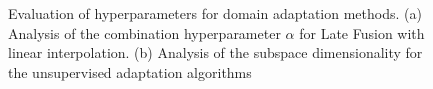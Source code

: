 \begin{figure}
\centering
{}
\caption{Evaluation of hyperparameters for domain adaptation methods. (a) Analysis of the combination hyperparameter $\alpha$ for Late Fusion with linear interpolation. (b) Analysis of the subspace dimensionality for the unsupervised adaptation algorithms}
\label{fig:hyperparam-eval}
\end{figure}
